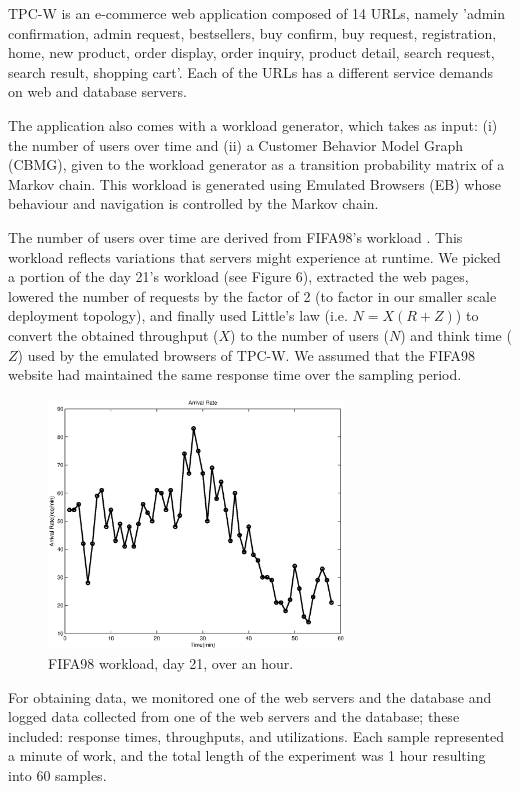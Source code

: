 TPC-W is an e-commerce web application composed of 14 URLs, namely 'admin confirmation, admin request, bestsellers, buy confirm, buy request, registration, home, new product, order display, order inquiry, product detail, search request, search result, shopping cart'.  Each of the URLs has a different service demands on web and database servers. 

The application also comes with a workload generator, which takes as input: (i) the number of users over time and (ii) a Customer Behavior Model Graph (CBMG), given to the workload generator as  a transition probability  matrix of a Markov chain. This workload is generated using Emulated Browsers (EB) whose behaviour and navigation is controlled by the Markov chain.  

The number of users over time are derived from FIFA98's workload \cite{arlitt_workload_2000}. This workload reflects variations that servers might experience at runtime. We picked a portion of the day 21's workload (see Figure 6), extracted the web pages, lowered the number of requests by the factor of 2 (to factor in our smaller scale deployment topology), and finally used Little's law \cite{little1961proof}  (i.e. $N=X(R+Z)$) to convert the obtained throughput ($X$) to the number of users ($N$) and think time ($Z$) used by the emulated browsers of TPC-W. We assumed that the FIFA98 website had maintained the same response time over the sampling period. %

 \begin{figure}[hp]
	\centering
		\includegraphics[width=0.7\textwidth]{image/workload-arr-rate.eps}
	\caption[FIFA98 workload, day 21, over an hour, used in demonstration of the estimation algorithm.]{FIFA98 workload, day 21, over an hour.}
	\label{fig:fig2}
\end{figure}
For obtaining data, we monitored one of the web servers and the database and logged data collected from one of the web servers and the database; these included: response times, throughputs, and utilizations. Each sample represented a minute of work, and the total length of the experiment was 1 hour resulting into 60 samples.

